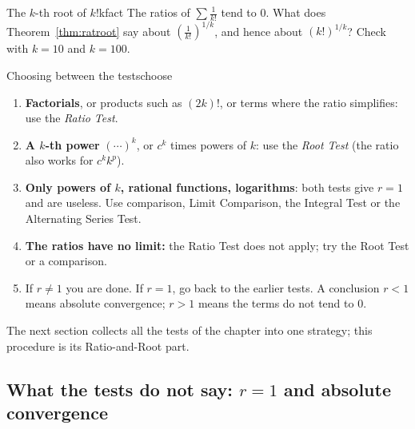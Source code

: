 \documentclass[11pt]{article}
\begin{document}
\begin{think}{The $k$-th root of $k!$}{kfact}
The ratios of $\sum\frac1{k!}$ tend to $0$. What does Theorem~\ref{thm:ratroot} say about $\left(\frac1{k!}\right)^{1/k}$, and hence about $(k!)^{1/k}$? Check with $k=10$ and $k=100$.
\end{think}

\begin{proc}{Choosing between the tests}{choose}
\begin{enumerate}[nosep]
  \item \textbf{Factorials}, or products such as $(2k)!$, or terms where the ratio simplifies: use the \emph{Ratio Test}.
  \item \textbf{A $k$-th power} $(\cdots)^k$, or $c^k$ times powers of $k$: use the \emph{Root Test} (the ratio also works for $c^kk^p$).
  \item \textbf{Only powers of $k$, rational functions, logarithms}: both tests give $r=1$ and are useless. Use comparison, Limit Comparison, the Integral Test or the Alternating Series Test.
  \item \textbf{The ratios have no limit:} the Ratio Test does not apply; try the Root Test or a comparison.
  \item If $r\ne1$ you are done. If $r=1$, go back to the earlier tests. A conclusion $r<1$ means absolute convergence; $r>1$ means the terms do not tend to $0$.
\end{enumerate}
The next section collects all the tests of the chapter into one strategy; this procedure is its Ratio-and-Root part.
\end{proc}

\subsection*{What the tests do not say: $r=1$ and absolute convergence}
\end{document}
